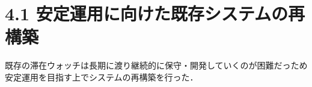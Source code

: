 






\section*{4.1 安定運用に向けた既存システムの再構築}

既存の滞在ウォッチは長期に渡り継続的に保守・開発していくのが困難だっため安定運用を目指す上でシステムの再構築を行った．














